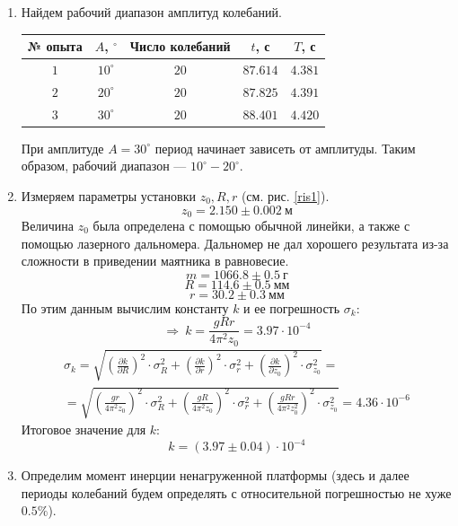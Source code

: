 \documentclass[a4paper,12pt]{article}
\begin{document}
\begin{enumerate}
	\item 
	Найдем рабочий диапазон амплитуд колебаний.
	\begin{table}[h]
		\centering
		\begin{tabular}{|c|c|c|c|c|} \hline 
			№ опыта & $A$, $^{\circ}$ & Число колебаний & $t$, с 	 & $T$, с  \\ \hline 
			$1$ 	& $10^{\circ}$	  & $20$ 			& $87.614$ 	 & $4.381$ \\ \hline 
			$2$ 	& $20^{\circ}$	  & $20$ 			& $87.825$ 	 & $4.391$ \\ \hline 
			$3$ 	& $30^{\circ}$	  & $20$ 			& $88.401$ 	 & $4.420$ \\ \hline 
		\end{tabular} 
	\end{table}

	При амплитуде $A = 30^{\circ}$ период начинает зависеть от амплитуды. Таким образом, рабочий диапазон --- $10^{\circ} - 20^{\circ}$.

	\item Измеряем параметры установки $z_0, R, r$ (см. рис. \ref{ris1}).
	$$
	z_0 = 2.150 \pm 0.002~\text{м}
	$$
	Величина $z_0$ была определена с помощью обычной линейки, а также с помощью лазерного дальномера. Дальномер не дал хорошего результата из-за сложности в приведении маятника в равновесие.
	$$
	m = 1066.8 \pm 0.5~\text{г}
	$$
	$$
	R = 114.6 \pm 0.5~\text{мм}
	$$
	$$
	r = 30.2 \pm 0.3~\text{мм}
	$$
	По этим данным вычислим константу $k$ и ее погрешность $\sigma_k$:
	$$
	\Rightarrow~k = \frac{gRr}{4\pi^2 z_0} = 3.97\cdot 10^{-4}
	$$ 
	\begin{multline*}
		\sigma_k = \sqrt{\left(\frac{\partial{k}}{\partial{R}}\right)^2\cdot\sigma_R^2 + \left(\frac{\partial{k}}{\partial{r}}\right)^2\cdot \sigma_r^2 + \left(\frac{\partial{k}}{\partial{z_0}}\right)^2\cdot \sigma_{z_0}^2} =  \\
		= \sqrt{\left(\frac{gr}{4\pi^2z_0}\right)^2\cdot \sigma_R^2 + \left(\frac{gR}{4\pi^2z_0}\right)^2\cdot \sigma_r^2 +  \left(\frac{gRr}{4\pi^2 z_0^2}\right)^2\cdot \sigma_{z_0}^2} = 4.36\cdot10^{-6}
	\end{multline*}
	Итоговое значение для $k$:
	$$
	k = (3.97 \pm 0.04)\cdot 10^{-4}
	$$

	\item Определим момент инерции ненагруженной платформы (здесь и далее периоды колебаний будем определять с относительной погрешностью не хуже $0.5\%$).
	

\end{enumerate}
\end{document}
